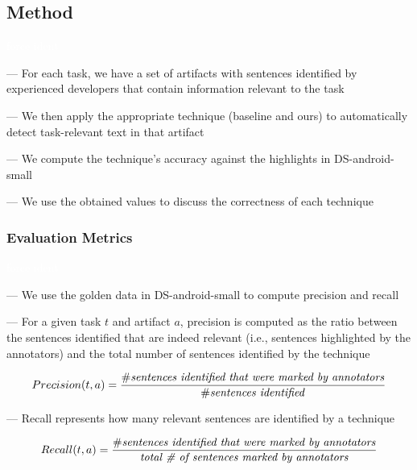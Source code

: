 \subsection{Method}
\textcolor{white}{force ident} %


--- For each task, we have a set of artifacts with sentences identified by experienced developers that contain information relevant to the task \vspace{3mm}

--- We then apply the appropriate technique (baseline and ours) to automatically detect task-relevant text in that artifact


--- We compute the technique's accuracy against the highlights in \acs{DS-android-small}

--- We use the obtained values to discuss the correctness of each technique






\subsubsection{Evaluation Metrics}
\textcolor{white}{force ident} %

--- We use the golden data in \acs{DS-android-small} to compute precision and recall


--- For a given task $t$ and artifact $a$, precision is computed as the ratio between the sentences identified that are indeed relevant (i.e., sentences highlighted by the annotators) and the total number of sentences identified by the technique


\begin{equation}
    Precision(t, a) = \frac{\# \text{\textit{sentences identified that were marked by annotators}}}{\# \text{\textit{sentences identified}}}
\end{equation}

\vspace{3mm}

--- Recall represents how many relevant sentences are identified by a technique


\begin{equation}
    Recall(t, a) = \frac{\# \text{\textit{sentences identified that were marked by annotators}}}{\text{\textit{total \# of sentences marked by annotators}}}
\end{equation}

